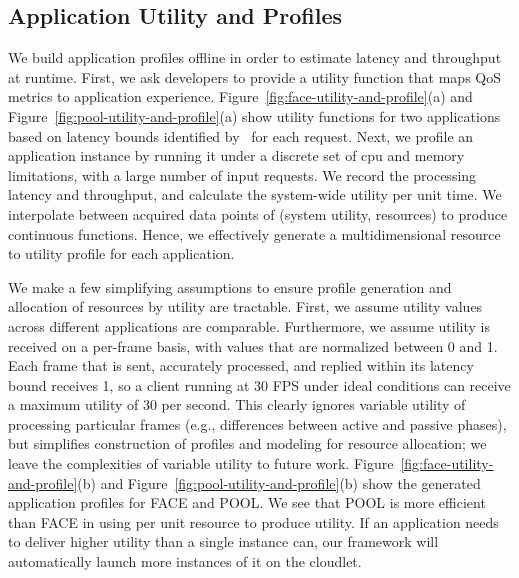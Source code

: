 \subsection{Application Utility and Profiles}

We build application profiles offline in order to estimate latency and
throughput at runtime. First, we ask developers to provide a utility
function that maps QoS metrics to application experience.
Figure~\ref{fig:face-utility-and-profile}(a) and
Figure~\ref{fig:pool-utility-and-profile}(a) show utility functions
for two applications based on latency bounds identified
by~\cite{chen2017empirical} for each request. Next, we profile an application
instance by running it under a discrete set of cpu and memory
limitations, with a large number of input requests. We record the
processing latency and throughput, and calculate the system-wide
utility per unit time. We interpolate between acquired data points of
(system utility, resources) to produce continuous functions.  Hence,
we effectively generate a multidimensional resource to utility profile
for each application.

We make a few simplifying assumptions to ensure profile generation and
allocation of resources by utility are tractable.  First, we assume utility
values across different applications are comparable. Furthermore, we assume
utility is received on a per-frame basis, with values that are normalized
between 0 and 1.  Each frame that is sent, accurately processed, and replied
within its latency bound receives 1, so a client running at 30 FPS under ideal
conditions can receive a maximum utility of 30 per second.  This clearly ignores
variable utility of processing particular frames (e.g., differences between
active and passive phases), but simplifies construction of profiles and modeling
for resource allocation; we leave the complexities of variable utility to future
work. Figure~\ref{fig:face-utility-and-profile}(b) and
Figure~\ref{fig:pool-utility-and-profile}(b) show the generated application
profiles for FACE and POOL. We see that POOL is more efficient than FACE in
using per unit resource to produce utility. If an application needs to deliver
higher utility than a single instance can, our framework will automatically
launch more instances of it on the cloudlet.
